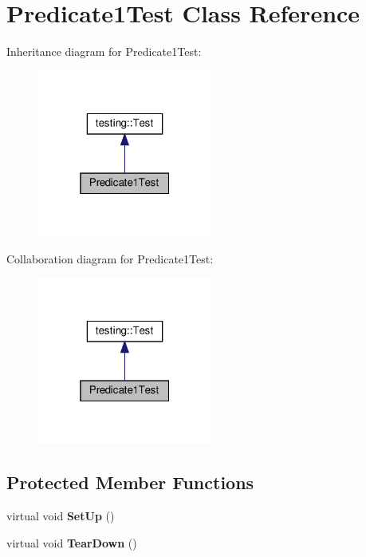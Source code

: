 \hypertarget{class_predicate1_test}{}\section{Predicate1\+Test Class Reference}
\label{class_predicate1_test}


Inheritance diagram for Predicate1\+Test\+:
\nopagebreak
\begin{figure}[H]
\begin{center}
\leavevmode
\includegraphics[width=163pt]{class_predicate1_test__inherit__graph}
\end{center}
\end{figure}


Collaboration diagram for Predicate1\+Test\+:
\nopagebreak
\begin{figure}[H]
\begin{center}
\leavevmode
\includegraphics[width=163pt]{class_predicate1_test__coll__graph}
\end{center}
\end{figure}
\subsection*{Protected Member Functions}
\begin{DoxyCompactItemize}
\item 
\mbox{\label{class_predicate1_test_a481704a09f73a37158513f9a336dbdd9}} 
virtual void {\bfseries Set\+Up} ()
\item 
\mbox{\label{class_predicate1_test_ad2974af5c6abc508847c3a9912b24a90}} 
virtual void {\bfseries Tear\+Down} ()
\end{DoxyCompactItemize}
